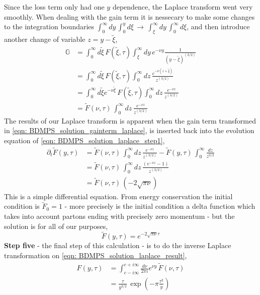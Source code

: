 \documentclass[main.tex]{subfiles}
\begin{document}
Since the loss term only had one \(y\) dependence, the Laplace transform went very smoothly. When dealing with the gain term it is nessecary to make some changes to the integration boundaries \(\int_0^\infty dy\, \int_0^y d\xi \,\rightarrow\, \int_\xi^\infty dy\, \int_0^\infty d\xi\), and then introduce another change of variable \(z = y-\tilde{\xi}\),
\begin{align}\label{eqn: BDMPS_solution_gainterm_laplace}
    \mathbb{G} &= \int_0^{\infty} d\tilde{\xi} \,F(\tilde{\xi}, \tau) \int_\xi^\infty dy\,  e^{-\nu y} \frac{1}{(y-\tilde{\xi})^{(3/2)}} \nonumber \\
    &= \int_0^{\infty} d\tilde{\xi} \,F(\tilde{\xi}, \tau) \int_0^\infty dz\, \frac{e^{-\nu (z+\tilde{\xi})}}{z^{(3/2)}} \nonumber \\
    &= \int_0^{\infty} d\tilde{\xi} e^{-\nu \tilde{\xi}} \,F(\tilde{\xi}, \tau) \int_0^\infty dz\, \frac{e^{-\nu z}}{z^{(3/2)}} \nonumber \\
    &= \tilde{F}(\nu, \tau) \, \int_0^\infty dz\, \frac{e^{-\nu z}}{z^{(3/2)}} 
\end{align}
The results of our Laplace transform is apparent when the gain term transformed in \autoref{eqn: BDMPS_solution_gainterm_laplace}, is inserted back into the evolution equation of \autoref{eqn: BDMPS_solution_laplace_step1}, 
\begin{align}\label{eqn: BDMPS_solution_laplace_step2}
    \partial_t \tilde{F}(y,\tau) &= \tilde{F}(\nu, \tau) \, \int_0^\infty dz\, \frac{e^{-\nu z}}{z^{(3/2)}} - \tilde{F}(y,\tau) \, \int_0^\infty \frac{dz}{z^{3/2}} \nonumber \\
    &= \tilde{F}(\nu, \tau) \, \int_0^\infty dz\, \frac{(e^{-\nu z}-1)}{z^{(3/2)}} \nonumber \\
    &= \tilde{F}(\nu, \tau) \, (-2 \sqrt{\pi \nu})
\end{align}
This is a simple differential equation. From energy conservation the initial condition is \(\tilde{F}_0 = 1\) - more precisely is the initial condition a delta function which takes into account partons ending with precisely zero momentum - but the solution is for all of our purposes, 
\begin{equation}\label{eqn: BDMPS_solution_laplace_result}
    \tilde{F}(y,\tau) = e^{-2\sqrt{\pi \nu}\tau}
\end{equation}
\textbf{Step five} - the final step of this calculation - is to do the inverse Laplace transformation on \autoref{eqn: BDMPS_solution_laplace_result},
\begin{align}
    F(y,\tau) &= \int_{c-i\infty}^{c+i\infty} \frac{d\nu}{2\pi i} e^{\nu y} \,\tilde{F}(\nu,\tau) \nonumber \\
    &= \frac{\tau}{y^{3/2}} \, \exp\left(-\pi \frac{\tau^2}{y}\right)
\end{align}
\end{document}
